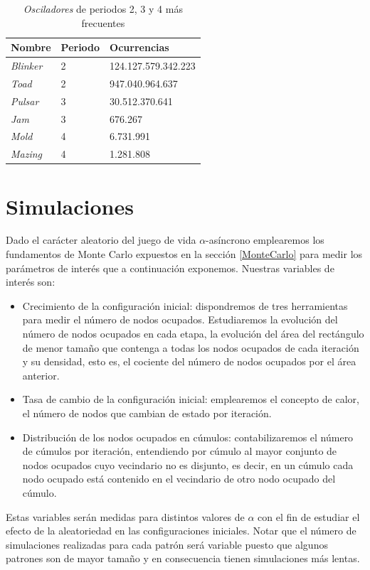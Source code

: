 \documentclass[../proyecto.tex]{memoir}
\begin{document}
\begin{table}
\centering
\begin{tabular}{|l|l|l|}
\hline
\textbf{Nombre}  & \textbf{Periodo} & \textbf{Ocurrencias} \\ \hline
\textit{Blinker} & 2                & 124.127.579.342.223  \\ \hline
\textit{Toad}    & 2                & 947.040.964.637      \\ \hline
\textit{Pulsar}  & 3                & 30.512.370.641       \\ \hline
\textit{Jam}     & 3                & 676.267              \\ \hline
\textit{Mold}    & 4                & 6.731.991            \\ \hline
\textit{Mazing}  & 4                & 1.281.808            \\ \hline
\end{tabular}
\caption{\textit{Osciladores} de periodos 2, 3 y 4 más frecuentes}
\label{tab:osciladores}
\end{table}

\section{Simulaciones} \label{vars}

Dado el carácter aleatorio del juego de vida $\alpha$-asíncrono emplearemos los fundamentos de Monte Carlo expuestos en la sección \ref{MonteCarlo} para medir los parámetros de interés que a continuación exponemos. Nuestras variables de interés son:

\begin{itemize}
\item Crecimiento de la configuración inicial: dispondremos de tres herramientas para medir el número de nodos ocupados. Estudiaremos la evolución del número de nodos ocupados en cada etapa, la evolución del área del rectángulo de menor tamaño que contenga a todas los nodos ocupados de cada iteración y su densidad, esto es, el cociente del número de nodos ocupados por el área anterior.
\item Tasa de cambio de la configuración inicial: emplearemos el concepto de calor, el número de nodos que cambian de estado por iteración.
\item Distribución de los nodos ocupados en cúmulos: contabilizaremos el número de cúmulos por iteración, entendiendo por cúmulo al mayor conjunto de nodos ocupados cuyo vecindario no es disjunto, es decir, en un cúmulo cada nodo ocupado está contenido en el vecindario de otro nodo ocupado del cúmulo.
\end{itemize}

Estas variables serán medidas para distintos valores de $\alpha$ con el fin de estudiar el efecto de la aleatoriedad en las configuraciones iniciales. Notar que el número de simulaciones realizadas para cada patrón será variable puesto que algunos patrones son de mayor tamaño y en consecuencia tienen simulaciones más lentas.

\end{document}
